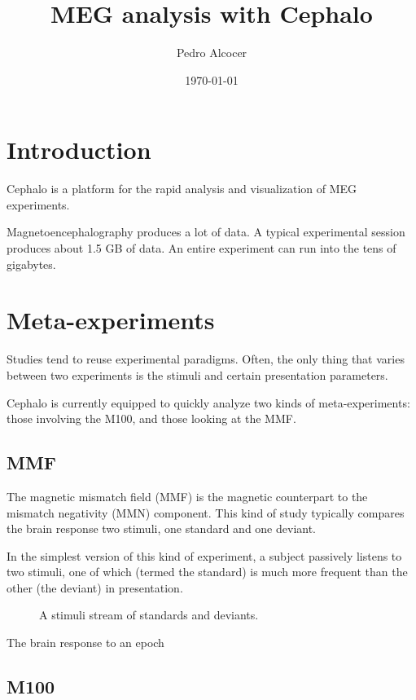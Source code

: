 \documentclass[oneside, 12pt]{article}
\title{MEG analysis with Cephalo}
\author{Pedro Alcocer}
\date{\today}
\begin{document}
\maketitle

\section{Introduction}

Cephalo is a platform for the rapid analysis and visualization of MEG experiments. 

Magnetoencephalography produces a lot of data. A typical experimental session produces about 1.5 GB of data. An entire experiment can run into the tens of gigabytes.

\section{Meta-experiments}

Studies tend to reuse experimental paradigms. Often, the only thing that varies between two experiments is the stimuli and certain presentation parameters. 

Cephalo is currently equipped to quickly analyze two kinds of meta-experiments: those involving the M100, and those looking at the MMF.

\subsection{MMF}

The magnetic mismatch field (MMF) is the magnetic counterpart to the mismatch negativity (MMN) component. This kind of study typically compares the brain response two stimuli, one standard and one deviant.

In the simplest version of this kind of experiment, a subject passively listens to two stimuli, one of which (termed the standard) is much more frequent than the other (the deviant) in presentation.

\begin{figure}[h]
	\begin{center}
	\setlength{\fboxsep}{10pt}%
\end{center}
\caption{A stimuli stream of standards and deviants.}
\end{figure}




The brain response to an epoch


\subsection{M100}
\end{document}
